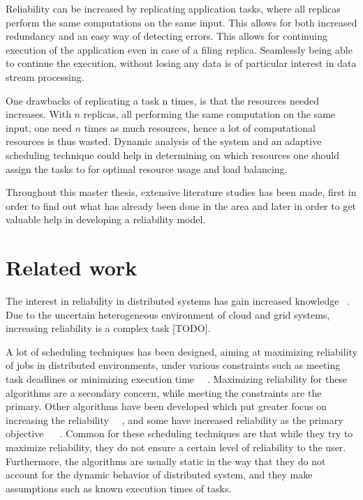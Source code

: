 \documentclass{cslthse-msc}
\begin{document}
Reliability can be increased by replicating application tasks, where all replicas perform the same computations on the same input. This allows for both increased redundancy and an easy way of detecting errors. This allows for continuing execution of the application even in case of a filing replica. Seamlessly being able to continue the execution, without losing any data is of particular interest in data stream processing.

One drawbacks of replicating a task n times, is that the resources needed increases. With $n$ replicas, all performing the same computation on the same input, one need $n$ times as much resources, hence a lot of computational resources is thus wasted. Dynamic analysis of the system and an adaptive scheduling technique could help in determining on which resources one should assign the tasks to for optimal resource usage and load balancing. 

Throughout this master thesis, extensive literature studies has been made, first in order to find out what has already been done in the area and later in order to get valuable help in developing a reliability model.

\section{Related work} \label{sec:introduction_related_work}
The interest in reliability in distributed systems has gain increased knowledge ~\cite{replicationManagement}. Due to the uncertain heterogeneous environment of cloud and grid systems, increasing reliability is a complex task [TODO]. %

A lot of scheduling techniques has been designed, aiming at maximizing reliability of jobs in distributed environments, under various constraints such as meeting task deadlines or minimizing execution time~\cite{algoOptTimeMaxRel} \cite{optTaskAllocationForMaxRel} \cite{taskAllocation} \cite{taskAllocationSwarm} \cite{algoMaxRelEndToEndConstraint} \cite{algoMinExTime} ~\cite{schedReplicas}. Maximizing reliability for these algorithms are a secondary concern, while meeting the constraints are the primary. Other algorithms have been developed which put greater focus on increasing the reliability~\cite{optResourceAllMaxPerformance} ~\cite{matchSchedAlgoMinFailure}, and some have increased reliability as the primary objective ~\cite{safetyRelTaskAllocation} ~\cite{improvedTaskAllMaxRel}. Common for these scheduling techniques are that while they try to maximize reliability, they do not ensure a certain level of reliability to the user. Furthermore, the algorithms are usually static in the way that they do not account for the dynamic behavior of distributed system, and they make assumptions such as known execution times of tasks.
\end{document}
